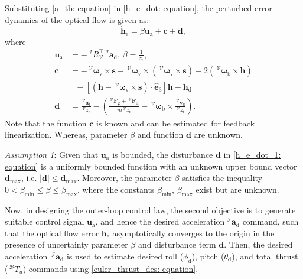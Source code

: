\documentclass[lettersize,journal]{IEEEtran}
\begin{document}
Substituting \eqref{a_tb: equation} in \eqref{h_e_dot: equation}, the perturbed error dynamics of the optical flow is given as:
\begin{equation} \label{h_e_dot_1: equation}
    \dot{\boldsymbol{h}}_\text{e} = \beta \boldsymbol{u}_\text{a} + \boldsymbol{c} + \boldsymbol{d},
\end{equation}
where 
\begin{align*}
    \boldsymbol{u}_\text{a} &= - \,^\mathcal{I}R_\mathcal{V}^\top \, ^\mathcal{I}\boldsymbol{a}_{\text{d}}, \,
    \beta = \frac{1}{z_{\text{t}}}, \\
    \boldsymbol{c} &=  - \,^\mathcal{V}\dot{\boldsymbol{\omega}}_{\text{v}} \times \boldsymbol{s} - \,^\mathcal{V}\boldsymbol{\omega}_{\text{v}} \times \left(\,^\mathcal{V} \boldsymbol{\omega}_{\text{v}} \times \boldsymbol{s} \right) - 2 \left(\,^\mathcal{V} \boldsymbol{\omega}_{\text{b}} \times \boldsymbol{h} \right) \nonumber \\
    &~~~ - \left[\left( \boldsymbol{h} - \,^\mathcal{V}\boldsymbol{\omega}_{\text{v}} \times \boldsymbol{s} \right) \cdot \hat{\boldsymbol{e}}_3 \right] \boldsymbol{h} - \dot{\boldsymbol{h}}_\text{d} \\
    \boldsymbol{d} &= \frac{\,^\mathcal{V}\boldsymbol{a}_{\text{t}}}{\,^\mathcal{V}z_{\text{t}}} - \left(\frac{\,^\mathcal{V}\boldsymbol{F_{\text{g}}} + \,^\mathcal{V}\boldsymbol{F_{\text{d}}}}{m \,^\mathcal{V}z_{\text{t}}} - \,^\mathcal{V}\boldsymbol{\omega}_{\text{b}} \times \frac{\,^\mathcal{V}\boldsymbol{v}_{\text{b}}}{\,^\mathcal{V}z_{\text{t}}} \right).
\end{align*}
Note that the function $\boldsymbol{c}$ is known and can be estimated for feedback linearization. Whereas, parameter $\beta$ and function $\boldsymbol{d}$ are unknown.

\textit{Assumption 1}: Given that $\boldsymbol{u}_\text{a}$ is bounded, the disturbance $\boldsymbol{d}$ in \eqref{h_e_dot_1: equation} is a uniformly bounded function with an unknown upper bound vector $\boldsymbol{d}_{\max}$, i.e. $\lvert \boldsymbol{d} \rvert \leq \boldsymbol{d}_{\max}$.
Moreover, the parameter $\beta$ satisfies the inequality $0 < \beta_{\min} \leq\beta\leq \beta_{\max}$, where the constants $\beta_{\min},\,\beta_{\max}$ exist but are unknown.

Now, in designing the outer-loop control law, the second objective is to generate suitable control signal $\boldsymbol{u}_\text{a}$, and hence the desired acceleration $^\mathcal{I}\boldsymbol{a}_{\text{d}}$ command, such that the optical flow error $\boldsymbol{h}_\text{e}$ asymptotically converges to the origin in the presence of uncertainty parameter $\beta$ and disturbance term $\boldsymbol{d}$.
Then, the desired acceleration $\,^\mathcal{I}\boldsymbol{a}_{\text{d}}$ is used to estimate desired roll (${\phi}_{\text{d}}$), pitch (${\theta}_{\text{d}}$), and total thrust ($\,^\mathcal{B} T_u$) commands using \eqref{euler_thrust_des: equation}.
\end{document}
